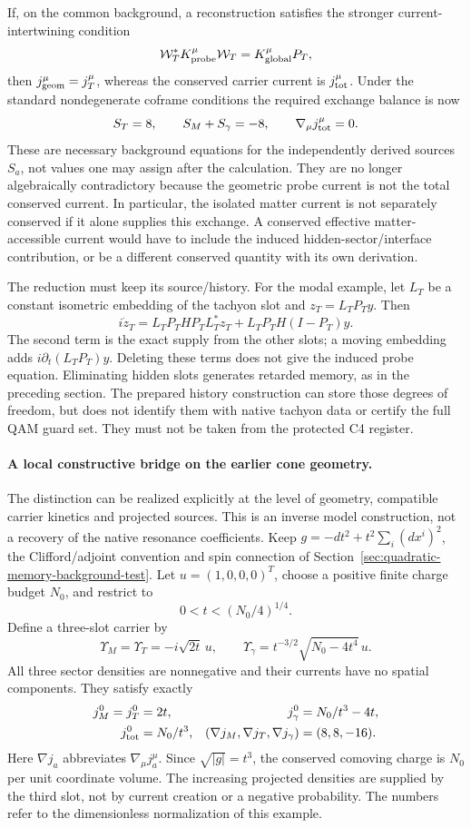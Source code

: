 \documentclass[11pt,a4paper]{article}
\begin{document}
If, on the common background, a reconstruction satisfies the stronger
current-intertwining condition
\[
 \mathcal W_T^*K_{\rm probe}^\mu\mathcal W_T
 =K_{\rm global}^\mu P_T,
\]
then $j_{\rm geom}^\mu=j_T^\mu$, whereas the conserved carrier current
is $j_{\rm tot}^\mu$. Under the standard nondegenerate coframe
conditions the required exchange balance is now
\[
 S_T=8,\qquad S_M+S_\gamma=-8,
 \qquad \nabla_\mu j_{\rm tot}^\mu=0.
\]
These are necessary background equations for the independently derived
sources $S_a$, not values one may assign after the calculation. They
are no longer algebraically contradictory because the geometric probe
current is not the total conserved current. In particular, the isolated
matter current is not separately conserved if it alone supplies this
exchange. A conserved effective matter-accessible current would have
to include the induced hidden-sector/interface contribution, or be a
different conserved quantity with its own derivation.

The reduction must keep its source/history. For the modal example,
let $L_T$ be a constant isometric embedding of the tachyon slot and
$z_T=L_TP_Ty$. Then
\[
 i\dot z_T=L_TP_THP_TL_T^*z_T
 +L_TP_TH(I-P_T)y.
\]
The second term is the exact supply from the other slots; a moving
embedding adds $i\partial_t(L_TP_T)y$. Deleting these terms does not
give the induced probe equation. Eliminating hidden slots generates
retarded memory, as in the preceding section. The prepared history
construction can store those degrees of freedom, but does not identify
them with native tachyon data or certify the full QAM guard set. They
must not be taken from the protected C4 register.

\paragraph{A local constructive bridge on the earlier cone geometry.}
The distinction can be realized explicitly at the level of geometry,
compatible carrier kinetics and projected sources. This is an inverse
model construction, not a recovery of the native resonance coefficients.
Keep $g=-dt^2+t^2\sum_i(dx^i)^2$, the Clifford/adjoint convention and
spin connection of Section~\ref{sec:quadratic-memory-background-test}.
Let $u=(1,0,0,0)^T$, choose a positive finite charge budget $N_0$, and
restrict to
\[
 0<t<(N_0/4)^{1/4}.
\]
Define a three-slot carrier by
\[
 \Upsilon_M=\Upsilon_T=-i\sqrt{2t}\,u,\qquad
 \Upsilon_\gamma=t^{-3/2}\sqrt{N_0-4t^4}\,u.
\]
All three sector densities are nonnegative and their currents have no
spatial components. They satisfy exactly
\[
 \begin{aligned}
 j_M^0=j_T^0&=2t,& j_\gamma^0&=N_0/t^3-4t,\\
 j_{\rm tot}^0&=N_0/t^3,&
 (\nabla j_M,\nabla j_T,\nabla j_\gamma)&=(8,8,-16).
 \end{aligned}
\]
Here $\nabla j_a$ abbreviates $\nabla_\mu j_a^\mu$. Since
$\sqrt{|g|}=t^3$, the conserved comoving charge is $N_0$ per unit
coordinate volume. The increasing projected densities are supplied by
the third slot, not by current creation or a negative probability.
The numbers refer to the dimensionless normalization of this example.
\end{document}
